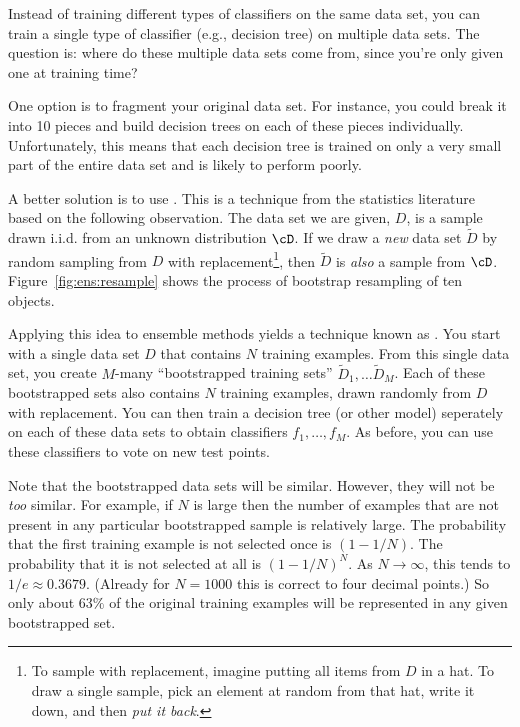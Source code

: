 Instead of training different types of classifiers on the same
data set, you can train a single type of classifier (e.g., decision
tree) on multiple data sets.  The question is: where do these multiple
data sets come from, since you're only given one at training time?

One option is to fragment your original data set.  For instance, you
could break it into 10 pieces and build decision trees on each of
these pieces individually.  Unfortunately, this means that each
decision tree is trained on only a very small part of the entire
data set and is likely to perform poorly.


A better solution is to use .  This is a
technique from the statistics literature based on the following
observation.  The data set we are given, $D$, is a sample drawn
i.i.d. from an unknown distribution $\cD$.  If we draw a \emph{new}
data set $\tilde D$ by random sampling from $D$ with
replacement\footnote{To sample with replacement, imagine putting all
  items from $D$ in a hat.  To draw a single sample, pick an element
  at random from that hat, write it down, and then \emph{put it
    back}.}, then $\tilde D$ is \emph{also} a sample from $\cD$.
Figure~\ref{fig:ens:resample} shows the process of bootstrap
resampling of ten objects.

Applying this idea to ensemble methods yields a technique known as
.  You start with a single data set $D$ that contains
$N$ training examples.  From this single data set, you create $M$-many
``bootstrapped training sets'' $\tilde D_1, \dots \tilde D_M$.  Each
of these bootstrapped sets also contains $N$ training examples, drawn
randomly from $D$ with replacement.  You can then train a decision
tree (or other model) seperately on each of these data sets to obtain
classifiers $f_1, \dots, f_M$.  As before, you can use these
classifiers to vote on new test points.

Note that the bootstrapped data sets will be similar.  However, they
will not be \emph{too} similar.  For example, if $N$ is large then the
number of examples that are not present in any particular bootstrapped
sample is relatively large.  The probability that the first training
example is not selected once is $(1- 1/N)$.  The probability that it
is not selected at all is $(1 - 1/N)^N$.  As $N \rightarrow \infty$,
this tends to $1/e \approx 0.3679$.  (Already for $N=1000$ this is correct
to four decimal points.)  So only about $63\%$ of the original
training examples will be represented in any given bootstrapped set.

